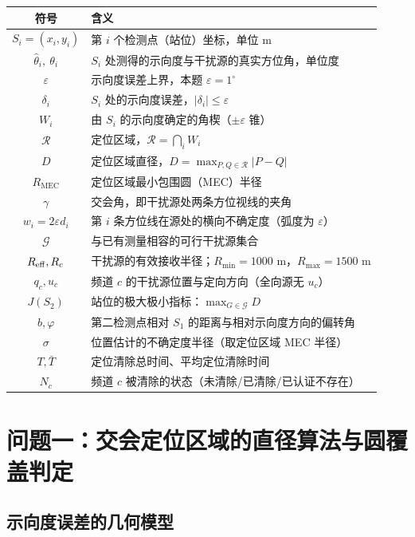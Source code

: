 \documentclass{cumcmthesis}
\begin{document}
\begin{center}
\begin{longtable}{cl}
\toprule
符号 & 含义\\
\midrule
\endhead
$S_i=(x_i,y_i)$ & 第 $i$ 个检测点（站位）坐标，单位 m\\
$\hat\theta_i,\ \theta_i$ & $S_i$ 处测得的示向度与干扰源的真实方位角，单位度\\
$\varepsilon$ & 示向度误差上界，本题 $\varepsilon=1^{\circ}$\\
$\delta_i$ & $S_i$ 处的示向度误差，$|\delta_i|\le\varepsilon$\\
$W_i$ & 由 $S_i$ 的示向度确定的角楔（$\pm\varepsilon$ 锥）\\
$\mathcal{R}$ & 定位区域，$\mathcal{R}=\bigcap_i W_i$\\
$D$ & 定位区域直径，$D=\max_{P,Q\in\mathcal{R}}|P-Q|$\\
$R_{\mathrm{MEC}}$ & 定位区域最小包围圆（MEC）半径\\
$\gamma$ & 交会角，即干扰源处两条方位视线的夹角\\
$w_i=2\varepsilon d_i$ & 第 $i$ 条方位线在源处的横向不确定度（弧度为 $\varepsilon$）\\
$\mathcal{G}$ & 与已有测量相容的可行干扰源集合\\
$R_{\rm eff},R_c$ & 干扰源的有效接收半径；$R_{\min}=1000$ m，$R_{\max}=1500$ m\\
$q_c,u_c$ & 频道 $c$ 的干扰源位置与定向方向（全向源无 $u_c$）\\
$J(S_2)$ & 站位的极大极小指标：$\max_{G\in\mathcal{G}}D$\\
$b,\varphi$ & 第二检测点相对 $S_1$ 的距离与相对示向度方向的偏转角\\
$\sigma$ & 位置估计的不确定度半径（取定位区域 MEC 半径）\\
$T,\bar T$ & 定位清除总时间、平均定位清除时间\\
$N_c$ & 频道 $c$ 被清除的状态（未清除/已清除/已认证不存在）\\
\bottomrule
\end{longtable}
\end{center}

\section{问题一：交会定位区域的直径算法与圆覆盖判定}

\subsection{示向度误差的几何模型}
\end{document}
